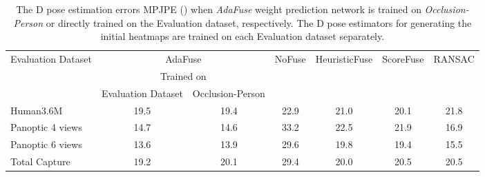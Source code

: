 \begin{table*}[]
\centering
\caption{ The D pose estimation errors MPJPE () when \emph{AdaFuse} weight prediction network is trained on \emph{Occlusion-Person} or directly trained on the {Evaluation} dataset, respectively. The D pose estimators for generating the initial heatmaps are trained on each Evaluation dataset separately.}
\label{table:unreal_generalize_to_other}
\begin{tabular}{l|cc|cccc}
\toprule
Evaluation   Dataset & \multicolumn{2}{c|}{AdaFuse}                                 & NoFuse                   & HeuristicFuse            & ScoreFuse                & RANSAC                   \\
               & \multicolumn{2}{c|}{Trained on}                              &                          &                          &                          &                          \\
               & \multicolumn{1}{l}{Evaluation Dataset} & Occlusion-Person         &                          &                          &                          &                          \\ \hline
Human3.6M                          & 19.5                     & 19.4                                 & 22.9                    & 21.0                                               & 20.1                                           & 21.8                                        \\
Panoptic 4 views                   & 14.7                     & 14.6                                 & 33.2                    & 22.5                                               & 21.9                                           & 16.9                                        \\
Panoptic 6 views                   & 13.6                     & 13.9                                 & 29.6                    & 19.8                                               & 19.4                                           & 15.5                                        \\
Total Capture                      & 19.2                     & 20.1                                 & 29.4                    & 20.0                                               & 20.5                                           & 20.5                                       \\
\toprule
\end{tabular}
\end{table*}




